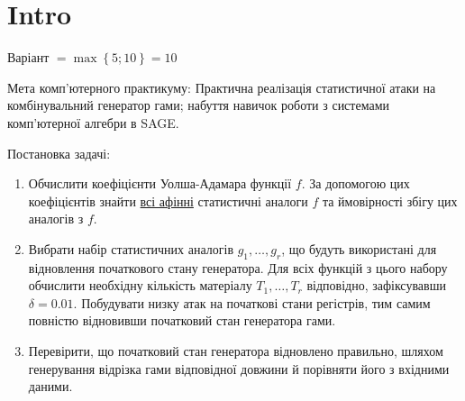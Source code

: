 \chapter{Intro}
\label{chap:2}
\begin{center}
    Варіант $ = \max \left\{5 ; 10\right\} = 10$
\end{center}

\noindent Мета комп'ютерного практикуму: Практична реалізація статистичної атаки на комбінувальний генератор гами; 
набуття навичок роботи з системами комп'ютерної алгебри в SAGE.

\noindent Постановка задачі:
\begin{enumerate}
    \item Обчислити коефіцієнти Уолша-Адамара функції $f$. За допомогою цих коефіцієнтів знайти \underline{всі афінні}
        статистичні аналоги $f$ та ймовірності збігу цих аналогів з $f$.
    \item Вибрати набір статистичних аналогів $g_{1}, \dots, g_{r}$, що будуть використані для відновлення початкового
        стану генератора. Для всіх функцій з цього набору обчислити необхідну кількість матеріалу $T_{1}, \dots, T_{r}$
        відповідно, зафіксувавши $\delta = 0.01$. Побудувати низку атак на початкові стани регістрів, тим самим 
        повністю відновивши початковий стан генератора гами.
    \item Перевірити, що початковий стан генератора відновлено правильно, шляхом генерування відрізка гами відповідної
        довжини й порівняти його з вхідними даними.
\end{enumerate}

